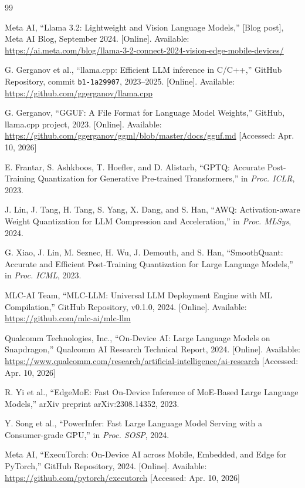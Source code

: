\documentclass[conference]{IEEEtran}
\begin{document}
\begin{thebibliography}{99}

Meta AI, ``Llama 3.2: Lightweight and Vision Language Models,''
[Blog post], Meta AI Blog, September 2024. [Online]. Available:
\url{https://ai.meta.com/blog/llama-3-2-connect-2024-vision-edge-mobile-devices/}

G. Gerganov et al., ``llama.cpp: Efficient LLM inference in C/C++,''
GitHub Repository, commit \texttt{b1-1a29907}, 2023--2025. [Online]. Available:
\url{https://github.com/ggerganov/llama.cpp}

G. Gerganov, ``GGUF: A File Format for Language Model Weights,''
GitHub, llama.cpp project, 2023. [Online]. Available: \url{https://github.com/ggerganov/ggml/blob/master/docs/gguf.md}
[Accessed: Apr. 10, 2026]

E. Frantar, S. Ashkboos, T. Hoefler, and D. Alistarh,
``GPTQ: Accurate Post-Training Quantization for Generative Pre-trained Transformers,''
in \textit{Proc. ICLR}, 2023.

J. Lin, J. Tang, H. Tang, S. Yang, X. Dang, and S. Han,
``AWQ: Activation-aware Weight Quantization for LLM Compression and Acceleration,''
in \textit{Proc. MLSys}, 2024.

G. Xiao, J. Lin, M. Seznec, H. Wu, J. Demouth, and S. Han,
``SmoothQuant: Accurate and Efficient Post-Training Quantization for Large Language Models,''
in \textit{Proc. ICML}, 2023.

MLC-AI Team, ``MLC-LLM: Universal LLM Deployment Engine with ML Compilation,''
GitHub Repository, v0.1.0, 2024. [Online]. Available:
\url{https://github.com/mlc-ai/mlc-llm}

Qualcomm Technologies, Inc., ``On-Device AI: Large Language Models on Snapdragon,''
Qualcomm AI Research Technical Report, 2024. [Online]. Available:
\url{https://www.qualcomm.com/research/artificial-intelligence/ai-research}
[Accessed: Apr. 10, 2026]

R. Yi et al., ``EdgeMoE: Fast On-Device Inference of MoE-Based Large Language Models,''
arXiv preprint arXiv:2308.14352, 2023.

Y. Song et al., ``PowerInfer: Fast Large Language Model Serving with a Consumer-grade GPU,''
in \textit{Proc. SOSP}, 2024.

Meta AI, ``ExecuTorch: On-Device AI across Mobile, Embedded, and Edge for PyTorch,''
GitHub Repository, 2024. [Online]. Available: \url{https://github.com/pytorch/executorch}
[Accessed: Apr. 10, 2026]


\end{thebibliography}
\end{document}
